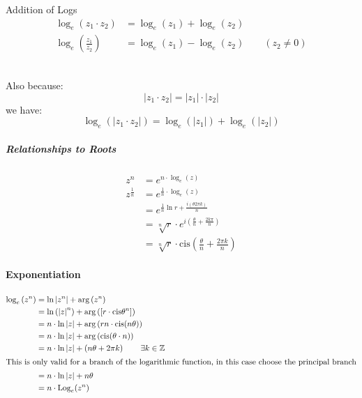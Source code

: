 \documentclass[class=article, crop=false]{standalone}
\begin{document}
\hfill\begin{minipage}{\dimexpr\textwidth-3cm}
\begin{tcolorbox}

Addition of Logs
\begin{align}
  \log_e{\left( z_1 \cdot z_2 \right) }&= \log_e{\left( z_1 \right) } +  \log_e{\left( z_2 \right) }\\
  \log_e{\left( \frac{z_1}{z_2} \right) } &= \log_e{\left( z_1 \right) } -  \log_e{\left( z_2 \right) } \qquad \left( z_2 \neq 0 \right)
\end{align}
\end{tcolorbox}

\end{minipage}
\ \\

Also because:
\[
    \left| z_1 \cdot  z_2 \right|  =      \left| z_1 \right|  \cdot     \left| z_2 \right|
\]
we have:
\[
\log_e{\left(     \left| z_1 \cdot z_2 \right|  \right) } =  \log_e{\left(     \left| z_1 \right|  \right) } +  \log_e{\left(     \left| z_2 \right|  \right) }
\]


\subparagraph{Relationships to Roots}
\begin{align*}
    z^n &=  e^{n\cdot \log_e{\left( z \right) }}\\
    z^\frac{1}{n} &=  e^{\frac{1}{n}\cdot \log_e{\left( z \right) }}\\
    &= e^{\frac{1}{n} \ln{ r } +  \frac{i\left( \theta 2\pi k \right) }{n}}\\
    &= \sqrt[n]{r} \cdot  e^{i \left( \frac{\theta}{n} +  \frac{2k \pi}{n} \right) }\\
      &= \sqrt[n]{r} \cdot \mathrm{cis}{\left( \frac{\theta}{n} +  \frac{2\pi k}{n} \right) }
\end{align*}

\paragraph{Exponentiation}
\begin{align*}
  \log_e{\left( z^n \right) } &=  \ln{      \left| z^n \right|  } +  \operatorname{arg}\left( z^n \right) \\
  &= \ln{ \left(     \left| z \right| ^n \right)  } +  \operatorname{arg}\left( \left[ r\cdot \mathrm{cis}{\theta}^n \right]  \right) \\
  &= n\cdot \ln{     \left| z \right|  } +  \operatorname{arg} \left( rn \cdot \mathrm{cis}{\left( n\theta \right) } \right) \\
  &= n\cdot \ln{     \left| z \right|  } +  \operatorname{arg}\left( \mathrm{cis}{\left( \theta\cdot n \right) } \right) \\
&=   n\cdot \ln{     \left| z \right|  } +  \left( n\theta +  2\pi k \right) \qquad \exists k \in \mathbb{Z}\\
\intertext{This is only valid for a branch of the logarithmic function, in this case choose the principal branch}
  &= n\cdot \ln{     \left| z \right|  }+ n\theta\\
  &= n\cdot \mathrm{Log}_e{\left( z^n \right) }
\end{align*}
\end{document}
